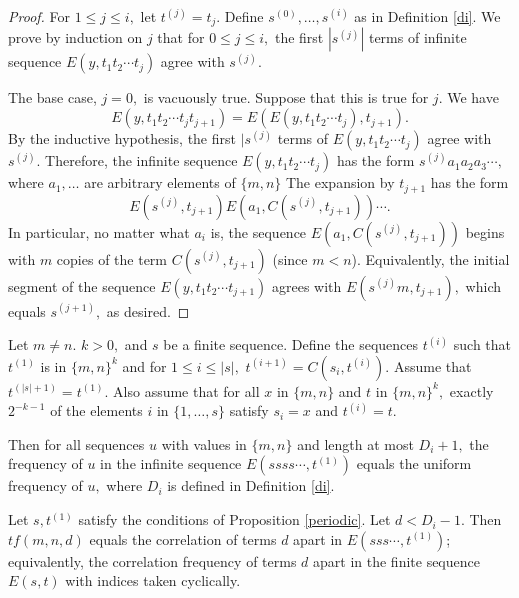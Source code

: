 \documentclass[11pt]{amsart} %
\begin{document}
\begin{proof} For $1 \le j \le i,$ let $t^{(j)} = t_j$. Define $s^{(0)}, \ldots, s^{(i)}$ as in Definition \ref{di}. We prove by induction on $j$ that for $0 \le j \le i,$ the first $|s^{(j)}|$ terms of infinite sequence $E(y, t_1t_2\cdots t_j)$ agree with $s^{(j)}.$ 

The base case, $j = 0,$ is vacuously true. Suppose that this is true for $j.$ We have 
\[E(y, t_1 t_2 \cdots t_j t_{j+1}) = E( E(y, t_1 t_2 \cdots t_j), t_{j+1}).\]
By the inductive hypothesis, the first $|s^{(j)}$ terms of $E(y, t_1 t_2 \cdots t_j)$ agree with $s^{(j)}.$  Therefore, the infinite sequence $E(y, t_1 t_2 \cdots t_j)$ has the form $s^{(j)} a_1 a_2 a_3 \cdots,$ where $a_1, \ldots$ are arbitrary elements of $\{m,n\}$ The expansion by $t_{j+1}$ has the form
\[ E(s^{(j)}, t_{j+1}) E(a_1, C(s^{(j)}, t_{j+1})) \cdots.\]
In particular, no matter what $a_i$ is, the sequence $ E(a_1, C(s^{(j)}, t_{j+1}))$ begins with $m$ copies of the term $ C(s^{(j)}, t_{j+1})$ (since $m<n$). Equivalently, the initial segment of the sequence $E(y, t_1 t_2 \cdots t_{j+1})$ agrees with $E(s^{(j)} m, t_{j+1}),$ which equals $s^{(j+1)},$ as desired.
\end{proof}

\begin{proposition}\label{periodic}Let $m \neq n.$ $k >0,$ and $s$ be a finite sequence. Define the sequences $t^{(i)}$ such that $t^{(1)}$ is in $\{m,n\}^k$ and for $1 \le i \le |s|,$ $t^{(i+1)} = C(s_i, t^{(i)}).$ Assume that $t^{(|s|+1)} = t^{(1)}$. Also assume that for all $x$ in $\{m,n\}$ and $t$ in $\{m,n\}^k,$ exactly $2^{-k-1}$ of the elements $i$ in $\{1, \ldots, s\}$ satisfy $s_i = x$ and $t^{(i)} = t.$ 

Then for all sequences $u$ with values in $\{m,n\}$ and length at most $D_i+1,$ the frequency of $u$ in the infinite sequence $E(s s s s \cdots, t^{(1)})$ equals the uniform frequency of $u,$ where $D_i$  is defined in Definition \ref{di}.

\end{proposition}

\begin{corollary}
Let $s, t^{(1)}$ satisfy the conditions of Proposition \ref{periodic}. Let $d < D_i - 1.$ Then $tf(m,n,d)$ equals the correlation of terms $d$ apart in $E(s s s \cdots, t^{(1)})$; equivalently, the correlation frequency of terms $d$ apart in the finite sequence $E(s,t)$ with indices taken cyclically.
\end{corollary}
\end{document}
